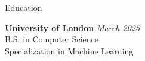 \documentclass[
	11pt, %
]{resume} %
\begin{document}

\begin{rSection}{Education}
	
	\textbf{University of London} \hfill \textit{March 2025} \\ 
	B.S. in Computer Science \\
	Specialization in Machine Learning \smallskip \\
	
\end{rSection}

\end{document}
